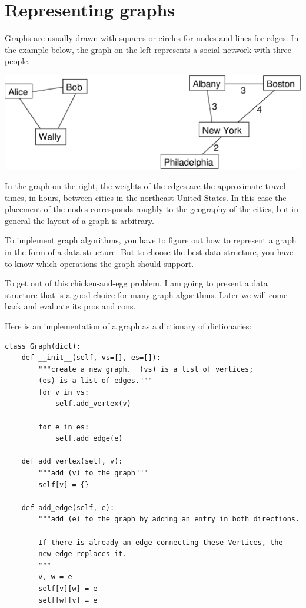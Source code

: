 \documentclass[10pt]{book}
\begin{document}
\section{Representing graphs}

Graphs are usually drawn with squares or circles for nodes and lines
for edges.  In the example below, the graph on the left represents
a social network with three people.


\beforefig
\centerline{\includegraphics[width=5.5in]{figs/graph_examples.eps}}
\afterfig

In the graph on the right, the weights of the edges are the
approximate travel times, in hours, between cities in the northeast
United States.  In this case the placement of the nodes corresponds
roughly to the geography of the cities, but in general the layout
of a graph is arbitrary.

To implement graph algorithms, you have to figure
out how to represent a graph in the form of a data structure.
But to choose the best data structure, you have to know which
operations the graph should support.

To get out of this chicken-and-egg problem, I am going to present
a data structure that is a good choice for many graph algorithms.
Later we will come back and evaluate its pros and cons.

Here is an implementation of a graph as a dictionary of dictionaries:

\begin{verbatim}
class Graph(dict):
    def __init__(self, vs=[], es=[]):
        """create a new graph.  (vs) is a list of vertices;
        (es) is a list of edges."""
        for v in vs:
            self.add_vertex(v)
            
        for e in es:
            self.add_edge(e)

    def add_vertex(self, v):
        """add (v) to the graph"""
        self[v] = {}

    def add_edge(self, e):
        """add (e) to the graph by adding an entry in both directions.

        If there is already an edge connecting these Vertices, the
        new edge replaces it.
        """
        v, w = e
        self[v][w] = e
        self[w][v] = e
\end{verbatim}
\end{document}
